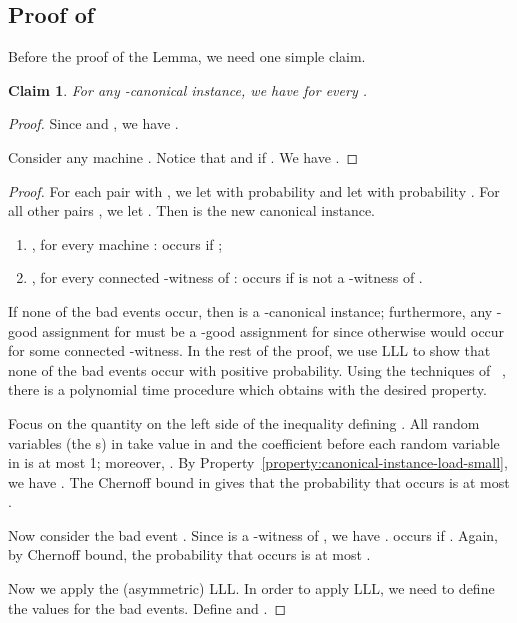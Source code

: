 \documentclass[11pt]{article}
\newtheorem{claim}{Claim}[section]
\newtheorem{claim}[lemma]{Claim}
\newcounter{prop}
\begin{document}
\subsection{Proof of }
\label{app:reducing-p-and-q-1}

Before the proof of the Lemma, we need one simple claim. 
\begin{claim}
\label{clm:degree-is-small}
For any -canonical instance, we have  for every . 
\end{claim}

\begin{proof}
Since  and , we have .  

Consider any machine . Notice that  and  if . We have .
\end{proof}

\reduceq*
\begin{proof}


For each pair  with , we let  with probability  and let  with probability .  For all other pairs , we let . Then  is the new canonical instance. 
\begin{enumerate}
\item , for every machine :   occurs if ;
\item , for every connected -witness  of :  occurs if  is not a -witness of .
\end{enumerate}

If none of the bad events occur, then  is a -canonical instance; furthermore, any -good assignment for  must be a -good assignment for  since
otherwise  would occur for some connected -witness.
In the rest of the proof, we use LLL to show that none of the bad events occur with positive probability. Using the techniques of ~\cite{MT10,HSS11}, there is a polynomial time procedure which obtains  with the desired property. 

Focus on the quantity  on the left side of the inequality defining .  All random variables (the s) in  take value in  and the coefficient before each random variable in  is at most 1; moreover, .
By Property~\ref{property:canonical-instance-load-small}, we have .    The Chernoff bound in  gives that the probability that  occurs is at most .  

Now consider the bad event . Since  is a -witness of , we have .    occurs if . Again, by Chernoff bound, the probability that  occurs is at most .

Now we apply the (asymmetric) LLL. In order to apply LLL, we need to define the  values for the bad events. 
Define  and . 


\end{proof}
\end{document}
